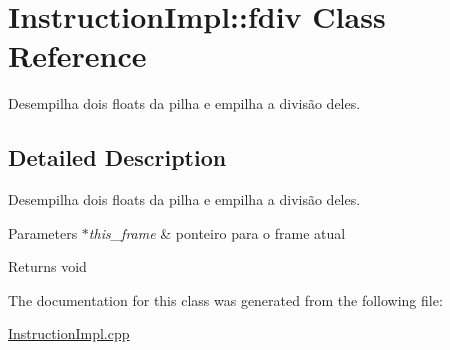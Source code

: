 \hypertarget{class_instruction_impl_1_1fdiv}{}\section{Instruction\+Impl\+:\+:fdiv Class Reference}
\label{class_instruction_impl_1_1fdiv}


Desempilha dois floats da pilha e empilha a divisão deles.  




\subsection{Detailed Description}
Desempilha dois floats da pilha e empilha a divisão deles. 


\begin{DoxyParams}{Parameters}
{\em $\ast$this\+\_\+frame} & ponteiro para o frame atual \\
\hline
\end{DoxyParams}
\begin{DoxyReturn}{Returns}
void 
\end{DoxyReturn}


The documentation for this class was generated from the following file\+:\begin{DoxyCompactItemize}
\item 
\hyperlink{_instruction_impl_8cpp}{Instruction\+Impl.\+cpp}\end{DoxyCompactItemize}
